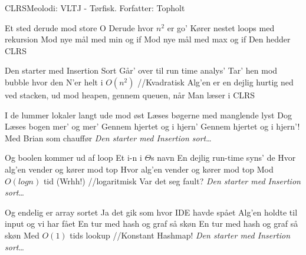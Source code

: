 \begin{sang}{CLRS}{Meolodi: VLTJ - Tørfisk. Forfatter: Topholt}
    \begin{vers}
    Et sted derude mod store O
    Derude hvor $n^2$ er go'
    Kører nestet loops med rekursion
    Mod nye mål med min og if
    Mod nye mål med max og if
    Den hedder CLRS
    \end{vers}
    
    \begin{omkvaed}
    Den starter med Insertion Sort
    Går' over til run time analys'
    Tar' hen mod bubble hvor den N'er helt i $O(n^2)$ //Kvadratisk
    Alg'en er en dejlig hurtig ned ved stacken, ud mod heapen, gennem queuen, når
    Man læser i CLRS
    \end{omkvaed}
    
    \begin{vers}
    I de lummer lokaler langt ude mod øst
    Læses bøgerne med manglende lyst
    Dog Læses bogen mer' og mer'
    Gennem hjertet og i hjern'
    Gennem hjertet og i hjern'!
    Med Brian som chauffør
    \emph{Den starter med Insertion sort}\ldots
    \end{vers}
    
    \begin{vers}
    Og boolen kommer ud af loop
    Et i-n i $\Theta$s navn
    En dejlig run-time syns' de
    Hvor alg'en vender og kører mod top
    Hvor alg'en vender og kører mod top
    Mod $O(log n)$ tid (Wrhh!) //logaritmisk
    Var det seg fault?
    \emph{Den starter med Insertion sort}\ldots
    \end{vers}

    \begin{vers}
    Og endelig er array sortet
    Ja det gik som hvor IDE havde spået
    Alg'en holdte til input og vi har fået
    En tur med hash og graf så skøn
    En tur med hash og graf så skøn
    Med $O(1)$ tids lookup //Konstant
    Hashmap!
    \emph{Den starter med Insertion sort}\ldots
    \end{vers} 
\end{sang}